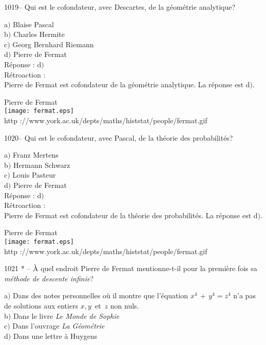 ﻿\documentclass[letterpaper, 12pt]{article}
\begin{document}
1019-- Qui est le cofondateur, avec Descartes, de la g\'eom\'etrie
analytique?

a$)$ Blaise Pascal \\
b$)$ Charles Hermite \\
c$)$ Georg Bernhard Riemann \\
d$)$ Pierre de Fermat\\

R\'eponse : d$)$\\

R\'etroaction : \\
Pierre de Fermat est cofondateur de la g\'eom\'etrie analytique.
La r\'eponse est d$)$.\\

        \begin{center}
        Pierre de Fermat\\
    \texttt{[image: fermat.eps]}\\
        {\footnotesize http
://www.york.ac.uk/depts/maths/histstat/people/fermat.gif}
    \end{center}

1020-- Qui est le cofondateur, avec Pascal, de la th\'eorie des
probabilit\'es?

a$)$ Franz Mertens \\
b$)$ Hermann Schwarz \\
c$)$ Louis Pasteur \\
d$)$ Pierre de Fermat\\

R\'eponse : d$)$\\

R\'etroaction : \\
Pierre de Fermat est cofondateur de la th\'eorie des probabilit\'es.
La r\'eponse est d$)$.\\

        \begin{center}
        Pierre de Fermat\\
    \texttt{[image: fermat.eps]}\\
        {\footnotesize http
://www.york.ac.uk/depts/maths/histstat/people/fermat.gif}
    \end{center}

1021 * -- \`A quel endroit Pierre de Fermat mentionne-t-il pour la
premi\`ere fois sa {\sl m\'ethode de descente infinie}?

a$)$ Dans des notes personnelles o\`u il montre que l'\'equation
$x^4\,+\,y^4=z^4$ n'a pas de solutions
aux entiers $x,y\,$ et $\,z$ non nuls. \\
b$)$ Dans le livre {\sl Le Monde de Sophie} \\
c$)$ Dans l'ouvrage {\sl La G\'eom\'etrie} \\
d$)$ Dans une lettre \`a Huygens\\
\end{document}
